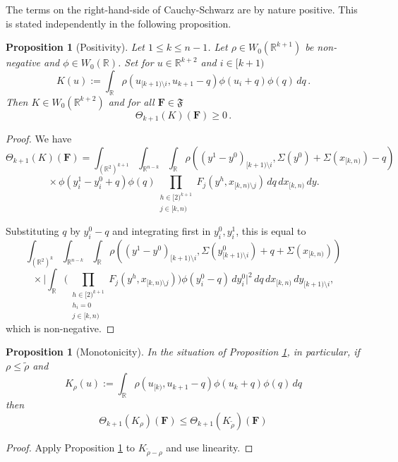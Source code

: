 \documentclass[12pt,reqno]{amsart}
\theoremstyle{plain}
\newtheorem{proposition}[theorem]{Proposition}
\numberwithin{equation}{section}
\theoremstyle{remark}
\newcommand{\uses}[1]{}
\newcommand{\usesdefs}[1]{}
\newcommand{\R}{{\mathbb R}}
\newcommand{\F}{\mathbf{F}}
\begin{document}
The terms on the right-hand-side of Cauchy-Schwarz are by nature positive. This is
stated independently in the following proposition.
\begin{proposition}[Positivity]\label{Positivity K}\uses{}\usesdefs{auto:Wiener-space-definition,normalized function tuples,prism Brascamp--Lieb}
 Let $1\le k\le n-1$. Let $\rho\in W_0(\R^{k+1})$ be non-negative and
$\phi\in W_0(\R)$. Set for $u\in\R^{k+2}$ and $i\in [k+1)$
\begin{equation}\label{auto:positive-kernel-K}
    K(u):=\int_\R \rho(u_{[k+1)\setminus i}, u_{k+1}-q) \phi(u_{i}+q) \phi(q) \, dq\, .
\end{equation}
Then $K\in W_0(\R^{k+2})$ and for all $\mathbf{F}\in\mathfrak{F}$
\begin{equation}\label{auto:positive-K-form}
    \Theta_{k+1}(K)(\F)\ge 0\, .
\end{equation}
\end{proposition}

\begin{proof}
We have
\[
\Theta_{k+1}(K)(\F)
= \int_{(\R^2)^{k+1}}\int_{\R^{n-k}}\int_\R
\rho((y^1-y^0)_{[k+1)\setminus i},\Sigma(y^0)+\Sigma(x_{[k,n)})-q)
\]
\[
{}\times
\phi(y_i^1-y_i^0+q)\phi(q)
\prod_{\substack{h\in [2)^{k+1}\\j\in[k,n)}}
F_j(y^h,x_{[k,n)\setminus j})
\,dq\,dx_{[k,n)}\,dy .
\]

Substituting \(q\) by \(y_i^0-q\) and integrating first in \(y_i^0,y_i^1\), this is equal to
\[
\int_{(\R^2)^{k}}\int_{\R^{n-k}}\int_\R
\rho((y^1-y^0)_{[k+1)\setminus i},
\Sigma(y^0_{[k+1)\setminus i})+q+\Sigma(x_{[k,n)}))
\]
\[
{}\times
\Big|
\int_\R
\Big(
\prod_{\substack{h\in [2)^{k+1}\\ h_i=0\\ j\in[k,n)}}
F_j(y^h,x_{[k,n)\setminus j})
\Big)
\phi(y_i^0-q)\,dy_i^0
\Big|^2
\,dq\,dx_{[k,n)}\,dy_{[k+1)\setminus i},
\]
which is non-negative.
\end{proof}


\begin{proposition}[Monotonicity]\label{Monotonicity K}\uses{Positivity K}\usesdefs{auto:Wiener-space-definition,normalized function tuples,prism Brascamp--Lieb}In the situation of Proposition \ref{Positivity K},
in particular, if $\rho\le \tilde{\rho}$ and
\begin{equation}\label{auto:kernel-monotonicity-K-rho} K_\rho(u):=\int_\R \rho(u_{[k)}, u_{k+1}-q) \phi(u_{k}+q) \phi(q) \, dq\end{equation}
then
\begin{equation}\label{auto:kernel-monotonicity-bound} \Theta_{k+1}(K_\rho)(\F) \le \Theta_{k+1}(K_{\tilde{\rho}})(\F) \end{equation}
\end{proposition}
\begin{proof}
    Apply Proposition \ref{Positivity K} to $K_{\tilde{\rho}-\rho}$ and use linearity.
\end{proof}
\end{document}
